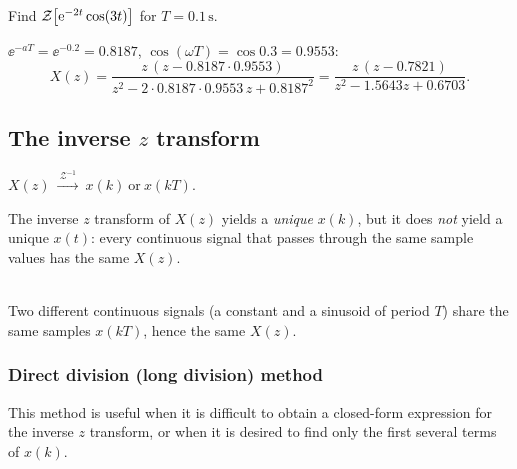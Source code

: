 \begin{problem}
Find $\mathcal{Z}\!\left[\mathrm{e}^{-2t}\cos(3t)\right]$ for $T=0.1\,\mathrm{s}$.
\end{problem}
\begin{solution}
$\ee^{-aT}=\ee^{-0.2}=0.8187$, $\cos(\omega T)=\cos0.3=0.9553$:
\[
  X(z)=\frac{z\,(z-0.8187\cdot0.9553)}{z^{2}-2\cdot0.8187\cdot0.9553\,z+0.8187^{2}}=\frac{z\,(z-0.7821)}{z^{2}-1.5643z+0.6703}.
\]
\end{solution}

\subsection{The inverse $z$ transform}
\begin{center}
$X(z)\ \xrightarrow{\ \mathcal{Z}^{-1}\ }\ x(k)\ \text{or}\ x(kT)$.
\end{center}
The inverse $z$ transform of $X(z)$ yields a \emph{unique} $x(k)$, but it does \emph{not} yield a unique
$x(t)$: every continuous signal that passes through the same sample values has the same $X(z)$.

\begin{center}
\\[2pt]
{\small Two different continuous signals (a constant and a sinusoid of period $T$) share the same samples
$x(kT)$, hence the same $X(z)$.}
\end{center}

\subsubsection{Direct division (long division) method}
This method is useful when it is difficult to obtain a closed-form expression for the inverse $z$
transform, or when it is desired to find only the first several terms of $x(k)$.

